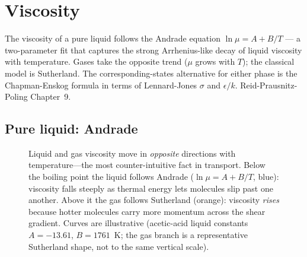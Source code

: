 \documentclass[11pt,a4paper]{article}
\begin{document}
\section{Viscosity}\label{ch:viscosity}

\begin{whatyoulllearn}
The viscosity of a pure liquid follows the Andrade equation $\ln \mu
= A + B/T$ --- a two-parameter fit that captures the strong
Arrhenius-like decay of liquid viscosity with temperature.  Gases
take the opposite trend ($\mu$ grows with $T$); the classical model
is Sutherland.  The corresponding-states alternative for either
phase is the Chapman-Enskog formula in terms of Lennard-Jones $\sigma$
and $\epsilon/k$.  Reid-Prausnitz-Poling Chapter~9.
\end{whatyoulllearn}

\subsection{Pure liquid: Andrade}

\begin{figure}[ht]
\centering
{}
\caption{Liquid and gas viscosity move in \emph{opposite} directions with
temperature---the most counter-intuitive fact in transport.  Below
the boiling point the liquid follows Andrade
($\ln\mu=A+B/T$, blue): viscosity falls steeply as thermal energy lets
molecules slip past one another.  Above it the gas follows Sutherland
(orange): viscosity \emph{rises} because hotter molecules carry more
momentum across the shear gradient.  Curves are illustrative (acetic-acid
liquid constants $A=-13.61$, $B=1761$~K; the gas branch is a
representative Sutherland shape, not to the same vertical scale).}
\label{fig:viscosity-trends}
\end{figure}
\end{document}
